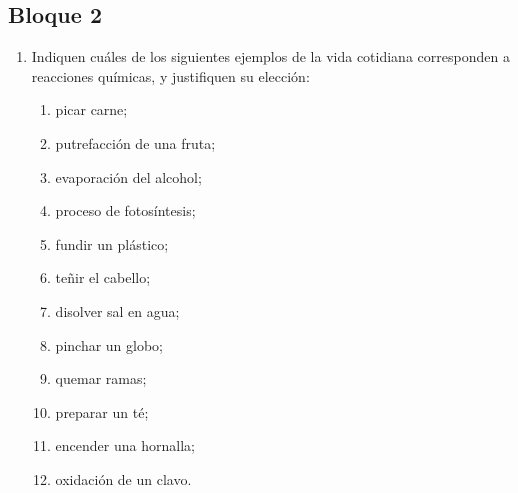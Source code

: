\documentclass[../Práctica.root.tex]{subfiles}
\begin{document}
\subsection{Bloque 2}
\begin{enumerate}
    \item Indiquen cuáles de los siguientes ejemplos de la vida cotidiana corresponden a reacciones
          químicas, y justifiquen su elección:
          \begin{enumerate}
              \item picar carne;
              \item putrefacción de una fruta; \checkmark
              \item evaporación del alcohol;
              \item proceso de fotosíntesis; \checkmark
              \item fundir un plástico;
              \item teñir el cabello; \checkmark %
              \item disolver sal en agua; %
              \item pinchar un globo;
              \item quemar ramas; \checkmark
              \item preparar un té;
              \item encender una hornalla; \checkmark
              \item oxidación de un clavo. \checkmark
          \end{enumerate}


\end{enumerate}
\end{document}
